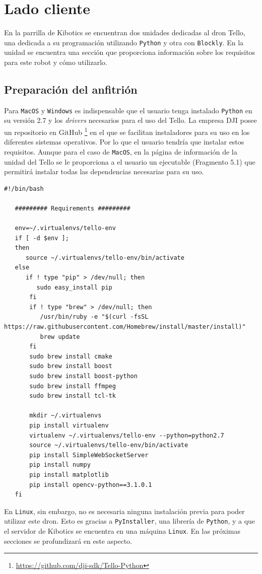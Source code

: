 \documentclass{report}
\begin{document}
\section{Lado cliente}

En la parrilla de Kibotics se encuentran dos unidades dedicadas al dron Tello, una dedicada a su programación utilizando \texttt{Python} y otra con \texttt{Blockly}. En la unidad se encuentra una sección que proporciona información sobre los requisitos para este robot y cómo utilizarlo. 


\subsection{Preparación del anfitrión}

Para \texttt{MacOS} y \texttt{Windows} es indispensable que el usuario tenga instalado \texttt{Python} en su versión 2.7 y los \textit{drivers} necesarios para el uso del Tello. La empresa DJI posee un repositorio en GitHub \footnote{\url{https://github.com/dji-sdk/Tello-Python}} en el que se facilitan instaladores para su uso en los diferentes sistemas operativos. Por lo que el usuario tendría que instalar estos requisitos. Aunque para el caso de \texttt{MacOS}, en la página de información de la unidad del Tello se le proporciona a el usuario un ejecutable (Fragmento 5.1) que permitirá instalar todas las dependencias necesarias para su uso.
\\
\begin{lstlisting}[frame=single,breaklines=true, label=Ejecutable de instalación para MacOS, caption=Ejecutable de instalación para MacOS,  captionpos=b]
   #!/bin/bash

   ######### Requirements #########

   env=~/.virtualenvs/tello-env
   if [ -d $env ];
   then
      source ~/.virtualenvs/tello-env/bin/activate
   else
      if ! type "pip" > /dev/null; then
         sudo easy_install pip
       fi
       if ! type "brew" > /dev/null; then
          /usr/bin/ruby -e "$(curl -fsSL https://raw.githubusercontent.com/Homebrew/install/master/install)"  
          brew update
       fi
       sudo brew install cmake
       sudo brew install boost
       sudo brew install boost-python
       sudo brew install ffmpeg
       sudo brew install tcl-tk
    
       mkdir ~/.virtualenvs
       pip install virtualenv
       virtualenv ~/.virtualenvs/tello-env --python=python2.7
       source ~/.virtualenvs/tello-env/bin/activate
       pip install SimpleWebSocketServer
       pip install numpy
       pip install matplotlib
       pip install opencv-python==3.1.0.1
   fi
\end{lstlisting}
En \texttt{Linux}, sin embargo, no es necesaria ninguna instalación previa para poder utilizar este dron. Esto es gracias a \texttt{PyInstaller}, una librería de \texttt{Python}, y a que el servidor de Kibotics se encuentra en una máquina \texttt{Linux}. En las próximas secciones se profundizará en este aspecto.
\end{document}
